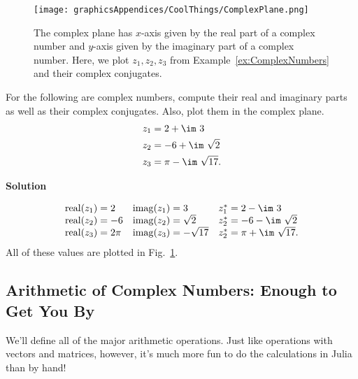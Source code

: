 \begin{figure}[htb!]
\centering
\texttt{[image: graphicsAppendices/CoolThings/ComplexPlane.png]}
\caption[]{The complex plane has $x$-axis given by the real part of a complex number and $y$-axis given by the imaginary part of a complex number. Here, we plot $z_1, z_2, z_3$ from Example~\ref{ex:ComplexNumbers} and their complex conjugates. }
\label{fig:ComplexPlane}
\end{figure}

\vspace*{0.2cm}
\begin{example}
\label{ex:ComplexNumbers}
For the following are complex numbers, compute their real and imaginary parts as well as their complex conjugates. Also, plot them in the complex plane.
$$\begin{aligned}
z_1 &= 2 + \im~3\\
z_2&= -6 + \im~ \sqrt{2} \\
z_3&= \pi -\im~\sqrt{17}.
\end{aligned}  $$
\end{example}

\textbf{Solution}

$$\begin{array}{lll}
\repart{z_1} = 2 & \impart{z_1} = 3 & z_1^\ast= 2 - \im~3\\
\repart{z_2} = -6 & \impart{z_2} = \sqrt{2} & z_2^\ast= -6 -\im ~\sqrt{2}\\
\repart{z_3} = 2\pi & \impart{z_3} = -\sqrt{17} & z_2^\ast= \pi + \im~ \sqrt{17}.\\
\end{array}  $$
All of these values are plotted in Fig.~\ref{fig:ComplexPlane}.


\Qed

\vspace*{0.2cm}

\subsection{Arithmetic of Complex Numbers: Enough to Get You By}

We'll define all of the major arithmetic operations. Just like operations with vectors and matrices, however, it's much more fun to do the calculations in Julia than by hand!\\

